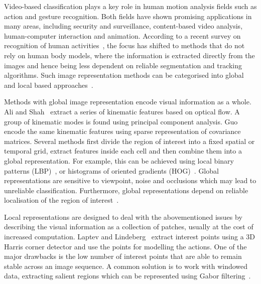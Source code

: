 \documentclass[10pt,twocolumn,letterpaper]{article}
\begin{document}
Video-based classification plays a key role in human motion analysis fields such as action and gesture recognition.
Both fields have shown promising applications in many areas,
including security and surveillance, content-based video analysis,
human-computer interaction and animation.
According to a recent survey on recognition of human activities~\cite{TuragaEtAl2008},
the focus has shifted to methods that do not rely on human body models,
where the information is extracted directly from the images
and hence being less dependent on reliable segmentation and tracking algorithms.
Such image representation methods can be categorised into 
global and local based approaches~\cite{Poppe2010}.

Methods with global image representation encode visual information as a whole.
Ali and Shah~\cite{AliAndShah2010} extract a series of kinematic features based on optical flow.
A group of kinematic modes is found using principal component analysis.
Guo \etal~\cite{GuoEtAl2010} encode the same kinematic features using sparse representation of covariance matrices.
Several methods first divide the region of interest into a fixed spatial or temporal grid,
extract features inside each cell and then combine them into a global representation.
For example, this can be achieved using local binary patterns (LBP)~\cite{KellokumpuEtAl2008},
or histograms of oriented gradients (HOG)~\cite{ThurauAndHlavac2008}.
Global representations are sensitive to viewpoint, noise and occlusions which may lead to unreliable classification.
Furthermore, global representations depend on reliable localisation of the region of interest~\cite{Poppe2010}.

Local representations are designed to deal with the abovementioned issues by describing the visual information as a collection of patches,
usually at the cost of increased computation.
Laptev and Lindeberg~\cite{LaptevAndLindeberg2003} extract interest points using a 3D Harris corner detector
and use the points for modelling the actions.
One of the major drawbacks is the low number of interest points that are able to remain stable across an image sequence.
A common solution is to work with windowed data,
extracting salient regions which can be represented using Gabor filtering~\cite{DollarEtAl2005}.
\end{document}
